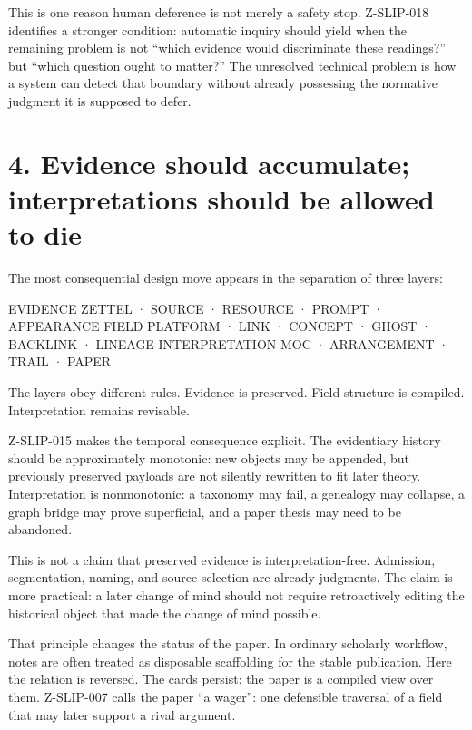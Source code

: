 \documentclass[
  11pt,
]{article}
\newenvironment{Shaded}{}{}
\newcommand{\NormalTok}[1]{#1}
\begin{document}
This is one reason human deference is not merely a safety stop.
Z-SLIP-018 identifies a stronger condition: automatic inquiry should
yield when the remaining problem is not ``which evidence would
discriminate these readings?'' but ``which question ought to matter?''
The unresolved technical problem is how a system can detect that
boundary without already possessing the normative judgment it is
supposed to defer.

\section{4. Evidence should accumulate; interpretations should be
allowed to
die}\label{evidence-should-accumulate-interpretations-should-be-allowed-to-die}

The most consequential design move appears in the separation of three
layers:

\begin{Shaded}
\begin{Highlighting}[]
\NormalTok{EVIDENCE       ZETTEL · SOURCE · RESOURCE · PROMPT · APPEARANCE}
\NormalTok{FIELD          PLATFORM · LINK · CONCEPT · GHOST · BACKLINK · LINEAGE}
\NormalTok{INTERPRETATION MOC · ARRANGEMENT · TRAIL · PAPER}
\end{Highlighting}
\end{Shaded}

The layers obey different rules. Evidence is preserved. Field structure
is compiled. Interpretation remains revisable.

Z-SLIP-015 makes the temporal consequence explicit. The evidentiary
history should be approximately monotonic: new objects may be appended,
but previously preserved payloads are not silently rewritten to fit
later theory. Interpretation is nonmonotonic: a taxonomy may fail, a
genealogy may collapse, a graph bridge may prove superficial, and a
paper thesis may need to be abandoned.

This is not a claim that preserved evidence is interpretation-free.
Admission, segmentation, naming, and source selection are already
judgments. The claim is more practical: a later change of mind should
not require retroactively editing the historical object that made the
change of mind possible.

That principle changes the status of the paper. In ordinary scholarly
workflow, notes are often treated as disposable scaffolding for the
stable publication. Here the relation is reversed. The cards persist;
the paper is a compiled view over them. Z-SLIP-007 calls the paper ``a
wager'': one defensible traversal of a field that may later support a
rival argument.
\end{document}
